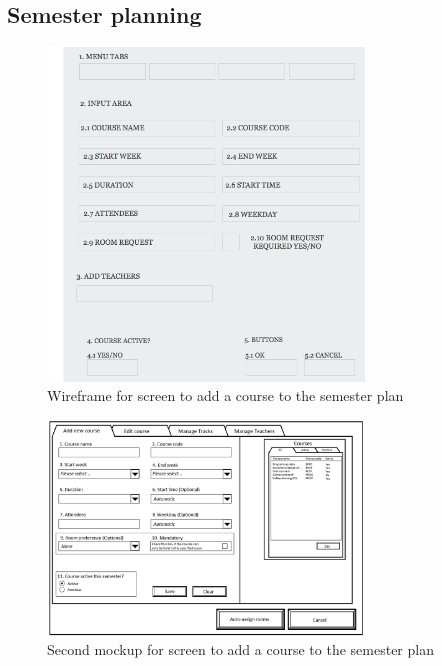\clearpage
\pagebreak

\subsection{Semester planning}

\begin{figure}[htb]
\begin{center}
\leavevmode
\includegraphics[width=0.75\textwidth]{images/wireframe_courses}
\end{center}
\caption{Wireframe for screen to add a course to the semester plan}
\label{fig:app2_mock1_w}
\end{figure}

\begin{figure}[htb]
\begin{center}
\leavevmode
\includegraphics[width=0.75\textwidth]{images/courseplan2_addcourse}
\end{center}
\caption{Second mockup for screen to add a course to the semester plan}
\label{fig:app2_mock2_1}
\end{figure}

